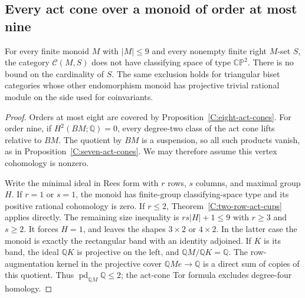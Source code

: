\subsection{Every act cone over a monoid of order at most nine}

\begin{theorem}\label{C:nine-act-cones}
For every finite monoid $M$ with $|M|\leq9$ and every nonempty
finite right $M$-set $S$, the category $\mathcal C(M,S)$ does not
have classifying space of type $\mathbb{CP}^2$.  There is no bound
on the cardinality of $S$.  The same exclusion holds for triangular
biset categories whose other endomorphism monoid has projective
trivial rational module on the side used for coinvariants.
\end{theorem}

\begin{proof}
Orders at most eight are covered by
Proposition~\ref{C:eight-act-cones}.  For order nine, if
$H^2(BM;\mathbb Q)=0$, every degree-two class of the act cone lifts
relative to $BM$.  The quotient by $BM$ is a suspension, so all
such products vanish, as in
Proposition~\ref{C:seven-act-cones}.  We may therefore assume this
vertex cohomology is nonzero.

Write the minimal ideal in Rees form with $r$ rows, $s$ columns,
and maximal group $H$.  If $r=1$ or $s=1$, the monoid has finite-group
classifying-space type and its positive rational cohomology is zero.
If $r\leq2$, Theorem~\ref{C:two-row-act-cups} applies directly.
The remaining size inequality is $rs|H|+1\leq9$ with $r\geq3$
and $s\geq2$.  It forces $H=1$, and leaves the shapes $3\times2$
or $4\times2$.  In the latter case the monoid is exactly the
rectangular band with an identity adjoined.  If $K$ is its band,
the ideal $\mathbb QK$ is projective on the left, and
$\mathbb QM/\mathbb QK=\mathbb Q$.  The row-augmentation kernel
in the projective cover $\mathbb QM e\to\mathbb Q$ is a direct
sum of copies of this quotient.  Thus
$\operatorname{pd}_{\mathbb QM}\mathbb Q\leq2$; the act-cone Tor
formula excludes degree-four homology.


\end{proof}
